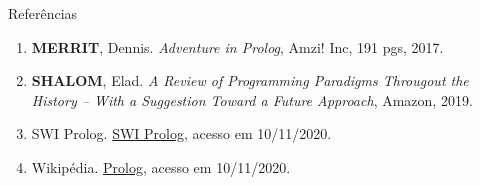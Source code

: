 \begin{frame}[fragile]{Referências}

    \begin{enumerate}
        \item \textbf{MERRIT}, Dennis. \textit{Adventure in Prolog}, Amzi! Inc, 191 pgs,
            2017.

        \item \textbf{SHALOM}, Elad. \textit{A Review of Programming Paradigms Througout the 
            History -- With a Suggestion Toward a Future Approach}, Amazon, 2019.

        \item SWI Prolog. \href{https://www.swi-prolog.org/}{SWI Prolog}, acesso em 
            10/11/2020.
 
        \item Wikipédia. \href{https://en.wikipedia.org/wiki/Prolog}{Prolog}, acesso em
            10/11/2020. 
    \end{enumerate}

\end{frame}
